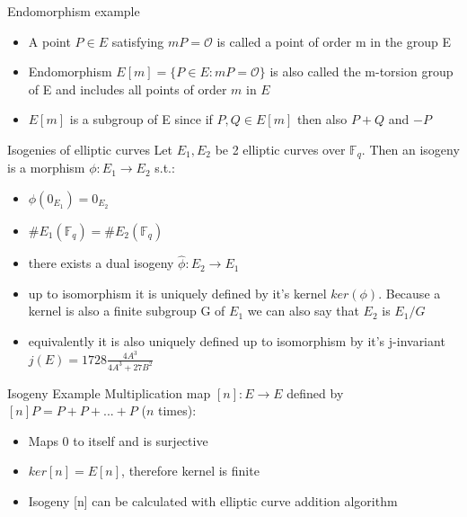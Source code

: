 \documentclass[handout]{beamer}
\begin{document}
\begin{frame}{Endomorphism example}
\begin{itemize}[\textbullet]
	\item A point $P\in E$ satisfying $mP=\mathcal{O}$ is called a point of order m in the group E\pause
	\item Endomorphism $E[m] = \{P\in E: mP = \mathcal{O}\}$ is also called the m-torsion group of E and includes all points of order $m$ in $E$\pause
	\item $E[m] $ is a subgroup of E since if $P,Q\in E[m]$ then also $P+Q$ and $-P$
\end{itemize}	

\end{frame}


\begin{frame}{Isogenies of elliptic curves}  %
Let $E_1,E_2$ be 2 elliptic curves over $\mathbb{F}_q$. Then an isogeny is a morphism $\phi: E_1 \to E_2$ s.t.:
\begin{itemize}[\textbullet]
	\item $\phi(0_{E_1})= 0_{E_2}$\pause
	\item $\#E_1(\mathbb{F}_q) = \#E_2(\mathbb{F}_q)$\pause
	\item there exists a dual isogeny $\hat{\phi}: E_2 \to E_1$\pause
	\item up to isomorphism it is uniquely defined by it's kernel $ker(\phi)$. Because a kernel is also a finite subgroup G of $E_1$ we can also say that $E_2$ is $E_1/G$\pause
	\item equivalently it is also uniquely defined up to isomorphism by it's j-invariant $j(E)=1728\frac{4A^3}{4A^3+27B^2}$
\end{itemize}
\end{frame}

\begin{frame}{Isogeny Example}
	Multiplication map $[n]: E \to E$ defined by $[n]P = P + P + ...+ P$ ($n$ times):
	\begin{itemize}[\textbullet]
		\item Maps 0 to itself and is surjective
		\item $ker[n] = E[n]$, therefore kernel is finite 
		\item Isogeny [n] can be calculated with elliptic curve addition algorithm %
		
	\end{itemize}

\end{frame}
\end{document}
